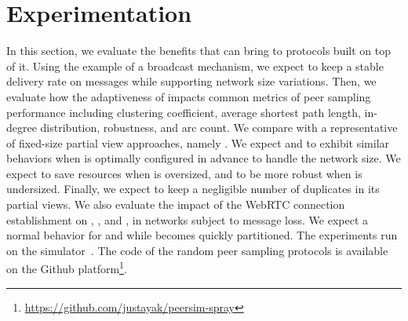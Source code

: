 \newcommand\SCALE{0.8}

\section{Experimentation}
\label{sec:experimentation}

In this section, we evaluate the benefits that \SPRAY can bring to
protocols built on top of it. Using the example of a broadcast
mechanism, we expect \SPRAY to keep a stable delivery rate on messages
while supporting network size variations. Then, we evaluate how the
adaptiveness of \SPRAY impacts common metrics of peer sampling
performance including clustering coefficient, average shortest path
length, in-degree distribution, robustness, and arc count. We compare \SPRAY with
a representative of fixed-size partial view approaches, namely
\CYCLON. We expect \SPRAY and \CYCLON to exhibit similar behaviors
when \CYCLON is optimally configured in advance to handle the network
size. We expect \SPRAY to save resources when \CYCLON is oversized,
and to be more robust when \CYCLON is undersized. Finally, we expect
\SPRAY to keep a negligible number of duplicates in its partial
views. We also evaluate the impact of the WebRTC connection establishment
on \CYCLON, \SCAMP, and \SPRAY, in  networks subject to message loss.
We expect a normal behavior for \CYCLON and \SPRAY while \SCAMP becomes
quickly partitioned.
The experiments run on the \PEERSIM
simulator~\cite{montresor2009peersim}. The code of the random peer
sampling protocols is available on the Github
platform\footnote{\url{https://github.com/justayak/peersim-spray}}.








